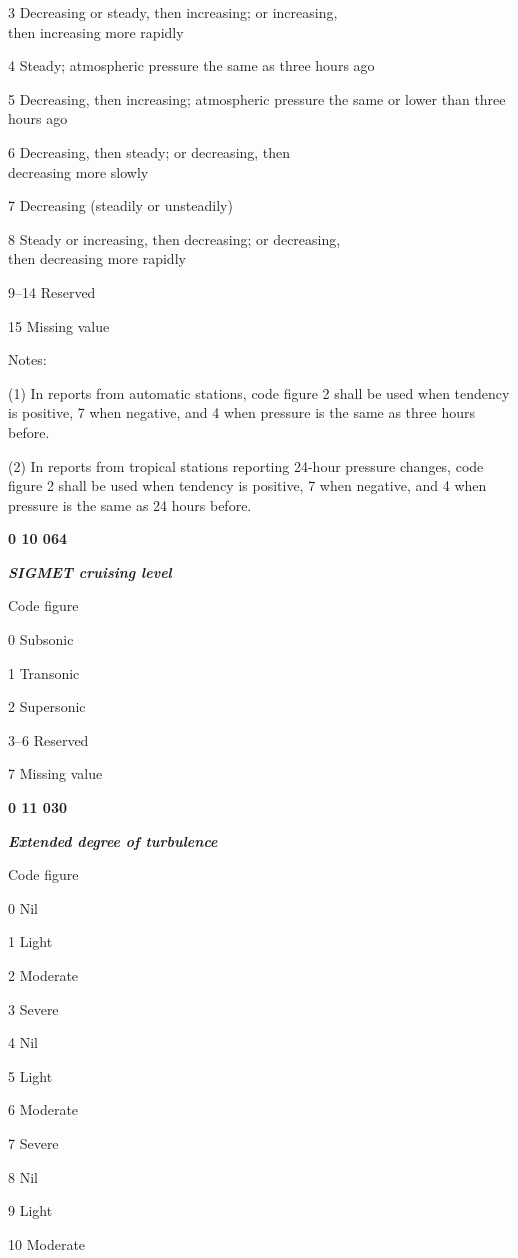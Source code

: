 3 Decreasing or steady, then increasing; or increasing,\\
then increasing more rapidly

4 Steady; atmospheric pressure the same as three hours ago

5 Decreasing, then increasing; atmospheric pressure the same or lower than three hours ago

6 Decreasing, then steady; or decreasing, then\\
decreasing more slowly

7 Decreasing (steadily or unsteadily)

8 Steady or increasing, then decreasing; or decreasing,\\
then decreasing more rapidly

9--14 Reserved

15 Missing value

Notes:

(1) In reports from automatic stations, code figure 2 shall be used when tendency is positive, 7 when negative, and 4 when pressure is the same as three hours before.

(2) In reports from tropical stations reporting 24-hour pressure changes, code figure 2 shall be used when tendency is positive, 7 when negative, and 4 when pressure is the same as 24 hours before.

\textbf{0 10 064}

\emph{\textbf{SIGMET cruising level}}

Code figure

0 Subsonic

1 Transonic

2 Supersonic

3--6 Reserved

7 Missing value

\textbf{0 11 030}

\emph{\textbf{Extended degree of turbulence}}

Code figure

0 Nil

1 Light

2 Moderate

3 Severe

4 Nil

5 Light

6 Moderate

7 Severe

8 Nil

9 Light

10 Moderate


